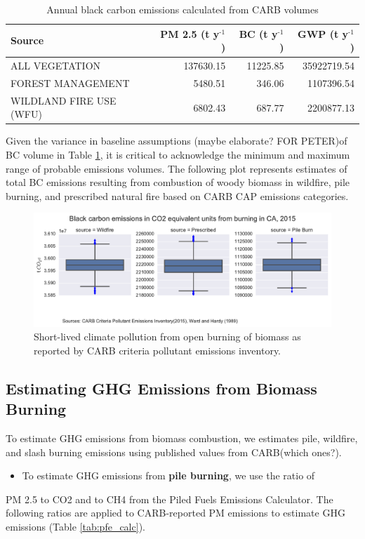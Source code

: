 \documentclass[a4paper]{article}
\begin{document}
\begin{table}[htb]
\caption{Annual black carbon emissions calculated from CARB volumes \label{tab:carb_bc}}
\centering
\begin{tabular}{lrrr}
Source & PM 2.5 (t y$^{\text{-1}}$) & BC (t y$^{\text{-1}}$) & GWP (t y$^{\text{-1}}$)\\
\hline
ALL VEGETATION & 137630.15 & 11225.85 & 35922719.54\\
FOREST MANAGEMENT & 5480.51 & 346.06 & 1107396.54\\
WILDLAND FIRE USE (WFU) & 6802.43 & 687.77 & 2200877.13\\
\end{tabular}
\end{table}



Given the variance in baseline assumptions (maybe elaborate? FOR PETER)of
BC volume in Table \ref{tab:bc_pm}, it is critical to acknowledge the 
minimum and maximum range of probable emissions volumes.
The following plot represents estimates of total BC emissions resulting
from combustion of woody biomass in wildfire, pile burning, and
prescribed natural fire based on CARB CAP emissions categories.


\begin{figure}[htb]
\centering
\includegraphics[width=\textwidth]{./graphics/bc_prob_gwp.pdf}
\caption{Short-lived climate pollution from open burning of biomass as reported by CARB criteria pollutant emissions inventory.\label{tab:bc_pm}}
\end{figure}

\subsection{Estimating GHG Emissions from Biomass Burning}
\label{sec-2-2}
To estimate GHG emissions from biomass combustion, we estimates pile, wildfire, and
slash burning emissions using published values from CARB(which ones?). 
\begin{itemize}
\item To estimate GHG emissions from \textbf{pile burning}, we use the ratio of
\end{itemize}
PM 2.5 to CO2 and to CH4 from the Piled Fuels
Emissions Calculator. The following ratios are applied to CARB-reported PM emissions to estimate GHG emissions (Table \ref{tab:pfe_calc}).
\end{document}

